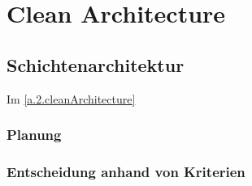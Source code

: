 
\chapter{Clean Architecture}

	\section{Schichtenarchitektur}
	Im \cite{} \cref{a.2.cleanArchitecture}
	
	\subsection{Planung}
	
	\subsection{Entscheidung anhand von Kriterien}